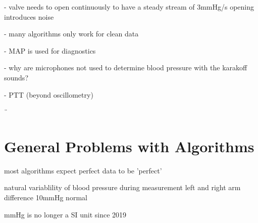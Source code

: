 - valve needs to open continuously to have a steady stream of 3mmHg/s
  opening introduces noise

- many algorithms only work for clean data

- MAP is used for diagnostics

- why are microphones not used to determine blood pressure with the karakoff sounds?

- PTT (beyond oscillometry)

¨
\
\section{General Problems with Algorithms}
most algorithms expect perfect data to be 'perfect'

natural variablility of blood pressure during measurement
left and right arm difference 10mmHg normal


mmHg is no longer a SI unit since 2019